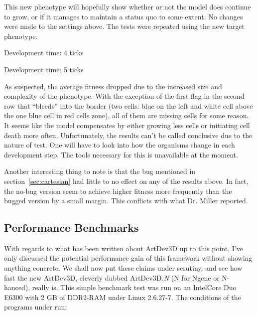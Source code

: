 \noindent This new phenotype will hopefully show whether or not the model does continue to grow, or if it manages to maintain a status quo to some extent. No changes were made to the settings above. The tests were repeated using the new target phenotype.

\begin{center}
	Development time: 4 ticks\newline
	~
\end{center}

\begin{center}
	Development time: 5 ticks\newline
	~
	~
\end{center}

As suspected, the average fitness dropped due to the increased size and complexity of the phenotype. With the exception of the first flag in the second row that ``bleeds'' into the border (two cells: blue on the left and white cell above the one blue cell in red cells zone), all of them are missing cells for some reason. It seems like the model compensates by either growing less cells or initiating cell death more often. Unfortunately, the results can't be called conclusive due to the nature of test. One will have to look into how the organisms change in each development step. The tools necessary for this is unavailable at the moment.

Another interesting thing to note is that the bug mentioned in section~\ref{sec:cartesian} had little to no effect on any of the results above. In fact, the no-bug version seem to achieve higher fitness more frequently than the bugged version by a small margin. This conflicts with what Dr. Miller reported.


\subsection{Performance Benchmarks}
With regards to what has been written about ArtDev3D up to this point, I've only discussed the potential performance gain of this framework without showing anything concrete. We shall now put these claims under scrutiny, and see how fast the new ArtDev3D, cleverly dubbed ArtDev3D\emph{.N} (N for Ngene or N-hanced), really is. This simple benchmark test was run on an Intel\textregistered Core Duo E6300 with 2 GB of DDR2-RAM under Linux 2.6.27-7. The conditions of the programs under run:

